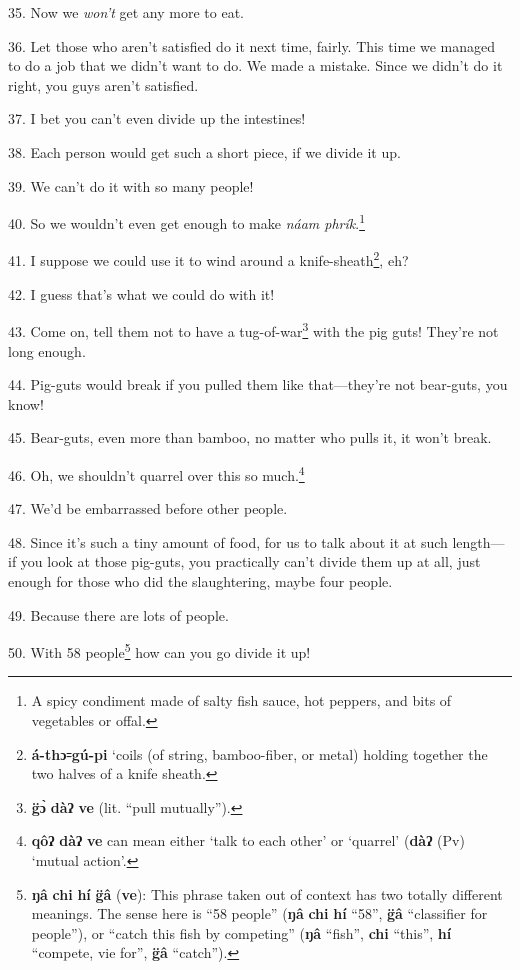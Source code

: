 35. Now we \textit{won't} get any more to eat.

36. Let those who aren't satisfied do it next time, fairly. This time we managed
to do a job that we didn't want to do. We made a mistake. Since we didn't do it
right, you guys aren't satisfied.


37. I bet you can't even divide up the intestines!

38. Each person would get such a short piece, if we divide it up.

39. We can't do it with so many people!

40. So we wouldn't even get enough to make \textit{náam phrík}.\footnote{A spicy condiment made of salty fish sauce, hot peppers, and bits of vegetables or offal.}

41. I suppose we could use it to wind around a knife-sheath\footnote{\textbf{á-thɔ꞊gú-pi} `coils (of string, bamboo-fiber, or metal) holding together the two halves of a knife sheath.}, eh?

42. I guess that's what we could do with it!

43. Come on, tell them not to have a tug-of-war\footnote{\textbf{g̈ɔ̀} \textbf{dàʔ} \textbf{ve} (lit. ``pull mutually'').} with the pig guts! They're
not long enough.

44. Pig-guts would break if you pulled them like that---they're not bear-guts,
you know!

45. Bear-guts, even more than bamboo, no matter who pulls it, it won't break.

46. Oh, we shouldn't quarrel over this so much.\footnote{\textbf{qôʔ} \textbf{dàʔ} \textbf{ve} can mean either `talk to each other' or `quarrel' (\textbf{dàʔ} (Pv) `mutual action'.}

47. We'd be embarrassed before other people.

48. Since it's such a tiny amount of food, for us to talk about it at such length---if
you look at those pig-guts, you practically can't divide them up at all, just enough
for those who did the slaughtering, maybe four people.

49. Because there are lots of people.

50. With 58 people\footnote{\textbf{ŋâ} \textbf{chi} \textbf{hí} \textbf{g̈â} (\textbf{ve}): This phrase taken out of context has two totally different meanings. The sense here is ``58 people'' (\textbf{ŋâ} \textbf{chi} \textbf{hí} ``58'', \textbf{g̈â} ``classifier for people''), or ``catch this fish by competing'' (\textbf{ŋâ} ``fish'', \textbf{chi} ``this'', \textbf{hí} ``compete, vie for'', \textbf{g̈â} ``catch'').} how can you go divide it up!

